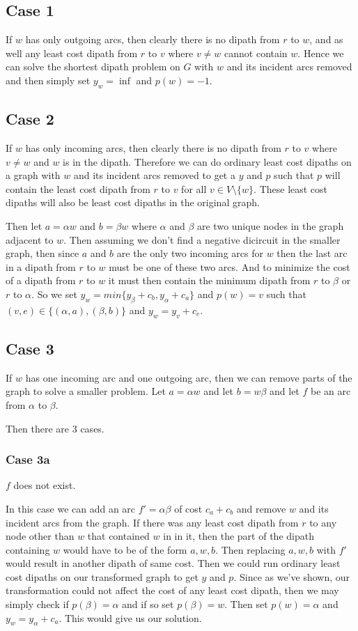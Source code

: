 \documentclass{article}
\begin{document}
\subsection*{Case 1}
If $w$ has only outgoing arcs, then clearly there is no dipath from $r$ to $w$, and as well any least cost dipath from $r$ to $v$ where $v \neq w$ cannot contain $w$. Hence we can solve the shortest dipath problem on $G$ with $w$ and its incident arcs removed and then simply set $y_w = \inf$ and $p(w) = -1$. 

\subsection*{Case 2}
If $w$ has only incoming arcs, then clearly there is no dipath from $r$ to $v$ where $v \neq w$ and $w$ is in the dipath. Therefore we can do ordinary least cost dipaths on a graph with $w$ and its incident arcs removed to get a $y$ and $p$ such that $p$ will contain the least cost dipath from $r$ to $v$ for all $v \in V \setminus \{w\}$. These least cost dipaths will also be least cost dipaths in the original graph.

Then let $a = \alpha w$ and $b = \beta w$ where $\alpha$ and $\beta$ are two unique nodes in the graph adjacent to $w$. Then assuming we don't find a negative dicircuit in the smaller graph, then since $a$ and $b$ are the only two incoming arcs for $w$ then the last arc in a dipath from $r$ to $w$ must be one of these two arcs. And to minimize the cost of a dipath from $r$ to $w$ it must then contain the minimum dipath from $r$ to $\beta$ or $r$ to $\alpha$. So we set $y_w = min \{ y_\beta + c_b, y_\alpha + c_a\} $ and
$p(w) = v$ such that $(v,e) \in \{(\alpha,a), (\beta,b)\}$ and $y_w = y_v + c_e$.

\subsection*{Case 3}
If $w$ has one incoming arc and one outgoing arc, then we can remove parts of the graph to solve a smaller problem. Let $a = \alpha w$ and let $b = w \beta$ and let $f$ be an arc from $\alpha$ to $\beta$. 


Then there are 3 cases.

\subsubsection*{Case 3a}
$f$ does not exist. 

In this case we can add an arc $f'=\alpha \beta$ of cost $c_a + c_b$ and remove $w$ and its incident arcs from the graph. If there was any least cost dipath from $r$ to any node other than $w$ that contained $w$ in in it, then the part of the dipath containing $w$ would have to be of the form $a, w, b$. Then replacing $a, w, b$ with $f'$ would result in another dipath of same cost. Then we could run ordinary least cost dipaths on our transformed graph to get $y$ and $p$. Since as we've shown, our transformation could not affect the cost of any least cost dipath, then we may simply check if $p(\beta) = \alpha$ and if so set $p(\beta) = w$. Then set $p(w) = \alpha$ and $y_w = y_\alpha + c_a$. This would give us our solution.
\end{document}
